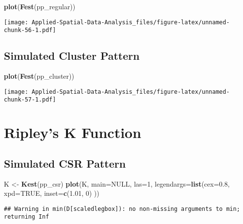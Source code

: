 \documentclass[
]{book}
\newenvironment{Shaded}{\begin{snugshade}}{\end{snugshade}}
\newcommand{\DataTypeTok}[1]{\textcolor[rgb]{0.13,0.29,0.53}{#1}}
\newcommand{\DecValTok}[1]{\textcolor[rgb]{0.00,0.00,0.81}{#1}}
\newcommand{\FloatTok}[1]{\textcolor[rgb]{0.00,0.00,0.81}{#1}}
\newcommand{\KeywordTok}[1]{\textcolor[rgb]{0.13,0.29,0.53}{\textbf{#1}}}
\newcommand{\NormalTok}[1]{#1}
\newcommand{\OtherTok}[1]{\textcolor[rgb]{0.56,0.35,0.01}{#1}}
\newcommand{\StringTok}[1]{\textcolor[rgb]{0.31,0.60,0.02}{#1}}
\begin{document}
\begin{Shaded}
\begin{Highlighting}[]
\KeywordTok{plot}\NormalTok{(}\KeywordTok{Fest}\NormalTok{(pp_regular))}
\end{Highlighting}
\end{Shaded}

\texttt{[image: Applied-Spatial-Data-Analysis\_files/figure-latex/unnamed-chunk-56-1.pdf]}

\hypertarget{simulated-cluster-pattern-3}{%
\subsection{Simulated Cluster Pattern}\label{simulated-cluster-pattern-3}}

\begin{Shaded}
\begin{Highlighting}[]
\KeywordTok{plot}\NormalTok{(}\KeywordTok{Fest}\NormalTok{(pp_cluster))}
\end{Highlighting}
\end{Shaded}

\texttt{[image: Applied-Spatial-Data-Analysis\_files/figure-latex/unnamed-chunk-57-1.pdf]}

\hypertarget{ripleys-k-function}{%
\section{Ripley's K Function}\label{ripleys-k-function}}

\hypertarget{simulated-csr-pattern-4}{%
\subsection{Simulated CSR Pattern}\label{simulated-csr-pattern-4}}

\begin{Shaded}
\begin{Highlighting}[]
\NormalTok{K <-}\StringTok{ }\KeywordTok{Kest}\NormalTok{(pp_csr)}
\KeywordTok{plot}\NormalTok{(K, }\DataTypeTok{main=}\OtherTok{NULL}\NormalTok{, }\DataTypeTok{las=}\DecValTok{1}\NormalTok{, }\DataTypeTok{legendargs=}\KeywordTok{list}\NormalTok{(}\DataTypeTok{cex=}\FloatTok{0.8}\NormalTok{, }\DataTypeTok{xpd=}\OtherTok{TRUE}\NormalTok{, }\DataTypeTok{inset=}\KeywordTok{c}\NormalTok{(}\FloatTok{1.01}\NormalTok{, }\DecValTok{0}\NormalTok{) ))}
\end{Highlighting}
\end{Shaded}

\begin{verbatim}
## Warning in min(D[scaledlegbox]): no non-missing arguments to min; returning Inf
\end{verbatim}
\end{document}
